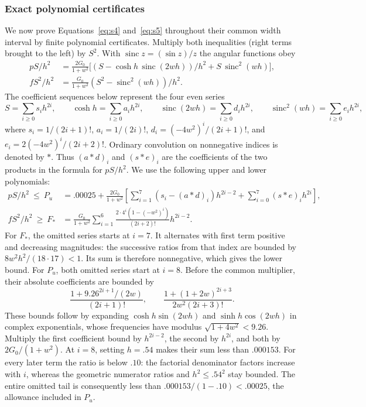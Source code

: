 \subsubsection{Exact polynomial certificates}
We now prove Equations~\eqref{eq:s4} and~\eqref{eq:s5} throughout their common
width interval by finite polynomial certificates. Multiply both inequalities (right terms brought to the left) by \(S^2\). With \(\operatorname{sinc} z=(\sin z)/z\) the angular functions obey
\[
\begin{aligned}
 pS/h^2 &= \frac{2G_0}{1+w^2}
  \big[(S-\cosh h\,\operatorname{sinc}(2wh))/h^2+S\,\operatorname{sinc}^2(wh)\big],\\
 f S^2/h^2 &= \frac{G_0}{1+w^2}(S^2-\operatorname{sinc}^2(wh))/h^2 .
\end{aligned}
\]
The coefficient sequences below represent the four even series
\[
 S=\sum_{i\ge0}s_i h^{2i},\qquad
 \cosh h=\sum_{i\ge0}a_i h^{2i},\qquad
 \operatorname{sinc}(2wh)=\sum_{i\ge0}d_i h^{2i},\qquad
 \operatorname{sinc}^2(wh)=\sum_{i\ge0}e_i h^{2i},
\]
where $s_i=1/(2i+1)!$, $a_i=1/(2i)!$,
$d_i=(-4w^2)^i/(2i+1)!$, and $e_i=2(-4w^2)^i/(2i+2)!$.
Ordinary convolution on nonnegative indices is denoted by $*$.
Thus $(a*d)_i$ and $(s*e)_i$ are the coefficients of the two
products in the formula for $pS/h^2$.
We use the following upper and lower polynomials:
\[
\begin{aligned}
 pS/h^2\ \le\ P_u&=.00025+\frac{2G_0}{1+w^2}
   \left[\sum_{i=1}^7(s_i-(a*d)_i)h^{2i-2}+\sum_{i=0}^7(s*e)_i h^{2i}\right],\\
 f S^2/h^2\ \ge\ F_*&=\frac{G_0}{1+w^2}\sum_{i=1}^6
         \frac{2\cdot4^i(1-(-w^2)^i)}{(2i+2)!}h^{2i-2}.
\end{aligned}
\]
For $F_*$, the omitted series starts at $i=7$. It alternates with
first term positive and decreasing magnitudes: the successive ratios
from that index are bounded by $8w^2h^2/(18\cdot17)<1$.
Its sum is therefore nonnegative, which gives the lower bound.
For $P_u$, both omitted series start at $i=8$.
Before the common multiplier, their absolute coefficients are bounded by
\[
 \frac{1+9.26^{2i+1}/(2w)}{(2i+1)!},\qquad
 \frac{1+(1+2w)^{2i+3}}{2w^2(2i+3)!}.
\]
These bounds follow by expanding $\cosh h\sin(2wh)$ and
$\sinh h\cos(2wh)$ in complex exponentials, whose frequencies
have modulus $\sqrt{1+4w^2}<9.26$.
Multiply the first coefficient bound by $h^{2i-2}$, the second by
$h^{2i}$, and both by $2G_0/(1+w^2)$.
At $i=8$, setting $h=.54$ makes their sum less than $.000153$.
For every later term the ratio is below $.10$: the factorial
denominator factors increase with $i$, whereas the geometric
numerator ratios and $h^2\le.54^2$ stay bounded.
The entire omitted tail is consequently less than
$.000153/(1-.10)<.00025$, the allowance included in $P_u$.

